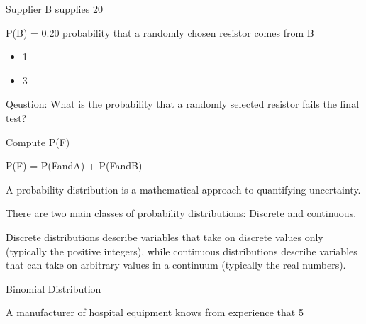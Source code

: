 \documentclass[12pt]{report}
\begin{document}
	Supplier B supplies 20%
	
	P(B) = 0.20 probability that a randomly chosen resistor comes from B
	
	
	
	\Large
	\begin{itemize}
		\item 1%
		\item 3%
	\end{itemize}
	
	
	
	Qeustion: What is the probability that a randomly selected resistor fails the final test?
	
	Compute P(F) 
	
	
	
	
	\Large
	P(F) = P(FandA) + P(FandB)
	
	
	












A probability distribution is a mathematical approach to quantifying uncertainty.

There are two main classes of probability distributions: Discrete and continuous. 

Discrete distributions describe variables that take on discrete values only (typically the positive integers), while continuous 
distributions describe variables that can take on arbitrary values in a continuum (typically the real numbers).














Binomial Distribution

A manufacturer of hospital equipment knows from experience that 5%
\end{document}
